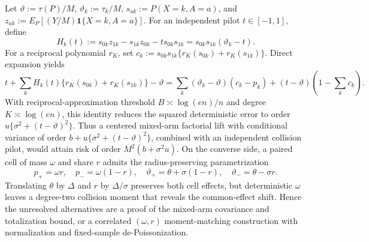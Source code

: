 Let \(\vartheta:=\tau(P)/M\), \(\vartheta_k:=\tau_k/M\), \(s_{ak}:=P(X=k,A=a)\), and \(z_{ak}:=E_P[(Y/M)\mathbf 1\{X=k,A=a\}]\).  For an independent pilot \(t\in[-1,1]\), define
\[
 H_k(t):=s_{0k}z_{1k}-s_{1k}z_{0k}-t s_{0k}s_{1k}
 =s_{0k}s_{1k}(\vartheta_k-t).
\]
For a reciprocal polynomial \(r_K\), set \(c_k:=s_{0k}s_{1k}\{r_K(s_{0k})+r_K(s_{1k})\}\).  Direct expansion yields
\[
 t+\sum_kH_k(t)\{r_K(s_{0k})+r_K(s_{1k})\}-\vartheta
 =\sum_k(\vartheta_k-\vartheta)(c_k-p_k)
 +(t-\vartheta)\left(1-\sum_kc_k\right).
\]
With reciprocal-approximation threshold \(B\asymp\log(en)/n\) and degree \(K\asymp\log(en)\), this identity reduces the squared deterministic error to order \(u\{\sigma^2+(t-\vartheta)^2\}\).  Thus a centered mixed-arm factorial lift with conditional variance of order \(b+u\{\sigma^2+(t-\vartheta)^2\}\), combined with an independent collision pilot, would attain risk of order \(M^2(b+\sigma^2u)\).  On the converse side, a paired cell of mass \(\omega\) and share \(r\) admits the radius-preserving parametrization
\[
 p_+=\omega r,\quad p_-=\omega(1-r),\quad
 \vartheta_+=\theta+\sigma(1-r),\quad
 \vartheta_-=\theta-\sigma r.
\]
Translating \(\theta\) by \(\Delta\) and \(r\) by \(\Delta/\sigma\) preserves both cell effects, but deterministic \(\omega\) leaves a degree-two collision moment that reveals the common-effect shift.  Hence the unresolved alternatives are a proof of the mixed-arm covariance and totalization bound, or a correlated \((\omega,r)\) moment-matching construction with normalization and fixed-sample de-Poissonization.